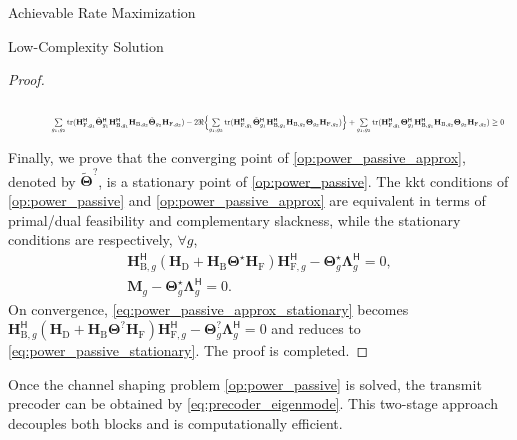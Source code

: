 \documentclass[journal]{IEEEtran}
\begin{document}
\begin{section}{Achievable Rate Maximization}
\begin{subsection}{Low-Complexity Solution}
\begin{proof}
\begin{figure}
\begin{equation}
{					}
				\end{equation}
				\begin{equation}
					\label{iq:nonnegative_norm_square}
					\resizebox{0.95\textwidth}{!}{
						$\sum\limits_{g_1,g_2} \mathrm{tr}(\mathbf{H}_{\mathrm{F},g_1}^\mathsf{H} \tilde{\mathbf{\Theta}}_{g_1}^\mathsf{H} \mathbf{H}_{\mathrm{B},g_1}^\mathsf{H} \mathbf{H}_{\mathrm{B},g_2} \tilde{\mathbf{\Theta}}_{g_2} \mathbf{H}_{\mathrm{F},g_2}) - 2 \Re \Bigl\{\sum\limits_{g_1,g_2} \mathrm{tr}(\mathbf{H}_{\mathrm{F},g_1}^\mathsf{H} \tilde{\mathbf{\Theta}}_{g_1}^\mathsf{H} \mathbf{H}_{\mathrm{B},g_1}^\mathsf{H} \mathbf{H}_{\mathrm{B},g_2} \mathbf{\Theta}_{g_2} \mathbf{H}_{\mathrm{F},g_2})\Bigr\} + \sum\limits_{g_1,g_2} \mathrm{tr}(\mathbf{H}_{\mathrm{F},g_1}^\mathsf{H} {\mathbf{\Theta}}_{g_1}^\mathsf{H} \mathbf{H}_{\mathrm{B},g_1}^\mathsf{H} \mathbf{H}_{\mathrm{B},g_2} {\mathbf{\Theta}}_{g_2} \mathbf{H}_{\mathrm{F},g_2}) \ge 0$
					}
				\end{equation}
				\hrulefill
			\end{figure}

			Finally, we prove that the converging point of \eqref{op:power_passive_approx}, denoted by $\tilde{\mathbf{\Theta}}^?$, is a stationary point of \eqref{op:power_passive}.
			The \gls{kkt} conditions of \eqref{op:power_passive} and \eqref{op:power_passive_approx} are equivalent in terms of primal/dual feasibility and complementary slackness, while the stationary conditions are respectively, $\forall g$,
			\begin{gather}
				\mathbf{H}_{\mathrm{B},g}^\mathsf{H} (\mathbf{H}_\mathrm{D} + \mathbf{H}_\mathrm{B} \mathbf{\Theta}^\star \mathbf{H}_\mathrm{F}) \mathbf{H}_{\mathrm{F},g}^\mathsf{H} - \mathbf{\Theta}_g^\star \mathbf{\Lambda}_g^\mathsf{H} = 0,\label{eq:power_passive_stationary}\\
				\mathbf{M}_g - \mathbf{\Theta}_g^\star \mathbf{\Lambda}_g^\mathsf{H} = 0.\label{eq:power_passive_approx_stationary}
			\end{gather}
			On convergence, \eqref{eq:power_passive_approx_stationary} becomes $\mathbf{H}_{\mathrm{B},g}^\mathsf{H} (\mathbf{H}_\mathrm{D} + \mathbf{H}_\mathrm{B} \mathbf{\Theta}^? \mathbf{H}_\mathrm{F}) \mathbf{H}_{\mathrm{F},g}^\mathsf{H} - \mathbf{\Theta}_g^? \mathbf{\Lambda}_g^\mathsf{H} = 0$ and reduces to \eqref{eq:power_passive_stationary}.
			The proof is completed.
		\end{proof}
		Once the channel shaping problem \eqref{op:power_passive} is solved, the transmit precoder can be obtained by \eqref{eq:precoder_eigenmode}.
		This two-stage approach decouples both blocks and is computationally efficient.
	\end{subsection}


\end{section}
\end{document}
